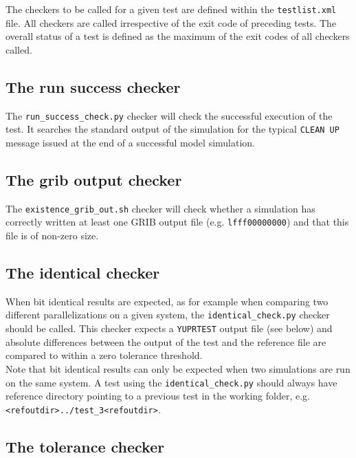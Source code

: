 \documentclass[12pt,twoside,a4paper]{report}
\newcommand{\tl}{\textless}
\newcommand{\tg}{\textgreater}
\begin{document}
The checkers to be called for a given test are defined within the \texttt{testlist.xml} file. All checkers are called irrespective of the exit code of preceding tests. The overall status of a test is defined as the maximum of the exit codes of all checkers called.

\subsection{The run success checker}

The \texttt{run\_success\_check.py} checker will check the successful execution of the test. It searches the standard output of the simulation for the typical \texttt{CLEAN UP} message issued at the end of a successful model simulation.

\subsection{The grib output checker}

The \texttt{existence\_grib\_out.sh} checker will check whether a simulation has correctly written at least one GRIB output file (e.g. \texttt{lfff00000000}) and that this file is of non-zero size.

\subsection{The identical checker}

When bit identical results are expected, as for example when comparing two different parallelizations on a given system, the \texttt{identical\_check.py} checker should be called. This checker expects a \texttt{YUPRTEST} output file (see below) and absolute differences between the output of the test and the reference file are compared to within a zero tolerance threshold.\\
Note that bit identical results can only be expected when two simulations are run on the same system. A test using the \texttt{identical\_check.py} should always have reference directory pointing to a previous test in the working folder, e.g. \texttt{\tl refoutdir\tg../test\_3\tl refoutdir\tg}.

\subsection{The tolerance checker}
\end{document}
